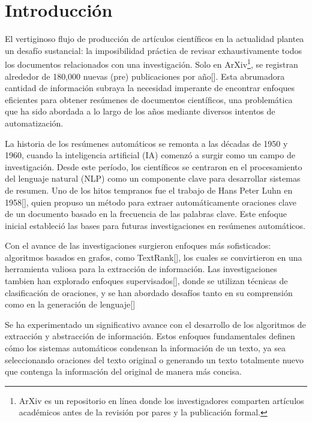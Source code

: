 \chapter*{Introducción}\label{chapter:introduction}

    El vertiginoso flujo de producción de artículos científicos en la actualidad plantea un desafío sustancial: la imposibilidad práctica de revisar exhaustivamente todos los documentos relacionados con una investigación. Solo en ArXiv\footnote{ArXiv es un repositorio en línea donde los investigadores comparten artículos académicos antes de la revisión por pares y la publicación formal.}, se registran alrededor de 180,000 nuevas (pre) publicaciones por año[\cite{arxivstats}]. Esta abrumadora cantidad de información subraya la necesidad imperante de encontrar enfoques eficientes para obtener resúmenes de documentos científicos, una problemática que ha sido abordada a lo largo de los años mediante diversos intentos de automatización.

    La historia de los resúmenes automáticos se remonta a las décadas de 1950 y 1960, cuando la inteligencia artificial (IA) comenzó a surgir como un campo de investigación. Desde este período, los científicos se centraron en el procesamiento del lenguaje natural (NLP) como un componente clave para desarrollar sistemas de resumen. Uno de los hitos tempranos fue el trabajo de Hans Peter Luhn en 1958[\cite{luhun1958}], quien propuso un método para extraer automáticamente oraciones clave de un documento basado en la frecuencia de las palabras clave. Este enfoque inicial estableció las bases para futuras investigaciones en resúmenes automáticos.

    Con el avance de las investigaciones surgieron enfoques más sofisticados: algoritmos basados en grafos, como TextRank[\cite{mihalcea2004textrank}], los cuales se convirtieron en una herramienta valiosa para la extracción de información. Las investigaciones tambien han explorado enfoques supervisados[\cite{collins-etal-2017-supervised}], donde se utilizan técnicas de clasificación de oraciones, y se han abordado desafíos tanto en su comprensión como en la generación de lenguaje[\cite{knight2000statistics}]

    Se ha experimentado un significativo avance con el desarrollo de los algoritmos de extracción y abstracción de información. Estos enfoques fundamentales definen cómo los sistemas automáticos condensan la información de un texto, ya sea seleccionando oraciones del texto original o generando un texto totalmente nuevo que contenga la información del original de manera más concisa.

